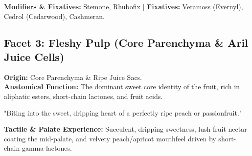 \documentclass[11pt,a4paper]{article}
\begin{document}
\textbf{Modifiers \& Fixatives:} Stemone, Rhubofix | \textbf{Fixatives:} Veramoss (Evernyl), Cedrol (Cedarwood), Cashmeran.

\newpage

\subsection{Facet 3: Fleshy Pulp (Core Parenchyma \& Aril Juice Cells)}

\begin{botanicalbox}
\textbf{Origin:} Core Parenchyma \& Ripe Juice Sacs.\\
\textbf{Anatomical Function:} The dominant sweet core identity of the fruit, rich in aliphatic esters, short-chain lactones, and fruit acids.
\end{botanicalbox}

\begin{sensoryquote}
"Biting into the sweet, dripping heart of a perfectly ripe peach or passionfruit."
\end{sensoryquote}

\begin{flavourbox}
\textbf{Tactile \& Palate Experience:} Succulent, dripping sweetness, lush fruit nectar coating the mid-palate, and velvety peach/apricot mouthfeel driven by short-chain gamma-lactones.
\end{flavourbox}

\begin{table}[htbp]
\centering
\caption{Primary Impact Actors for Facet 3 (Fleshy Pulp)}
\vspace{0.3em}
\end{table}
\end{document}
